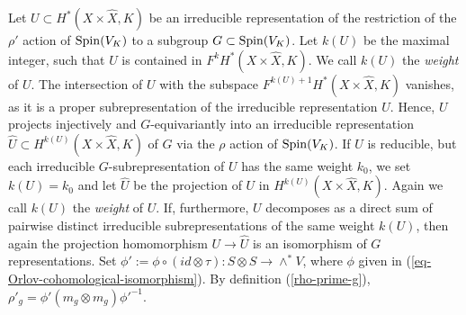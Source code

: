 \documentclass[12pt]{amsart}
\newcommand{\hide}[1]{}
\numberwithin{equation}{subsection}
\theoremstyle{plain}
\theoremstyle{definition}
\newcommand{\ZZ}{{\mathbb Z}}
\newcommand{\Spin}{{\rm Spin}}
\begin{document}
\hide{
Let $\tilde{\gamma}:DMon(X)\rightarrow GL(H^*(X\times\hat{X},\ZZ))$ be the action of the derived monodromy group of $X$ as in the proof of Lemma \ref{ch-3-alpha-is-second-partial-of-J}. Given $g\in DMon(X),$ the automorphism $\tilde{\gamma}(g)$ preserves the decreasing filtration $F^kH^*(X\times\hat{X},\ZZ):=\oplus_{i\geq k} H^i(X\times\hat{X},\ZZ)$, $0\leq k\leq 4n$.
We get an associated graded automorphism $\gamma(g)\in GL(H^*(X\times\hat{X},\ZZ))$ and the representation
\[
\gamma:DMon(X)\rightarrow GL(H^*(X\times\hat{X},\ZZ)).
\]
Denote by $\gamma_i:DMon(X)\rightarrow GL(H^i(X\times\hat{X},\ZZ))$ the restriction of the representation $\gamma$ to the $i$-th graded summand. Then $\gamma_1$ maps $DMon(X)/\{\pm 1\}$ isomorphically onto the image $SO^+(V)$ of $\Spin(V)$ in the orthogonal group of $V$ and $\gamma_i$ is $\wedge^i\gamma_1$. We denote by 
\[
\rho:\Spin(V)\rightarrow GL(\wedge^* V)\cong GL(H^*(X\times\hat{X},\ZZ))
\]
the graded extension of the natural homomorphism $\rho:\Spin(V)\rightarrow SO^+(V)$. Then $\gamma$ conjugates to $\rho$ via the isomorphism $DMon(X)\cong \Spin(V)$. The latter isomorphism is due to the fact that each is isomorphic to its image in $GL(S)$, $S=H^*(X,\ZZ)$, and the two images coincide.
Let
\[
\rho':\Spin(V)\rightarrow  GL(H^*(X\times\hat{X},\ZZ))
\]
be the conjugate of $\tilde{\gamma}$ via the above mentioned isomorphism $DMon(X)\cong \Spin(V)$.
The isomorphism $\phi:S\otimes S\rightarrow \wedge^*V,$ given in (\ref{eq-Orlov-cohomological-isomorphism}),  conjugates the $\Spin(V)$ action on $H^*(X\times X,\ZZ)$ to the $\rho'$ action. 
}

Let $U\subset H^*(X\times \hat{X},K)$ be an irreducible representation of the restriction of the $\rho'$ action of $\Spin(V_K)$ to a subgroup $G\subset \Spin(V_K)$.
Let $k(U)$ be the maximal integer, such that $U$ is contained in $F^kH^*(X\times \hat{X},K)$. We call $k(U)$ the {\em weight} of $U$. The intersection  of $U$ with the subspace $F^{k(U)+1}H^*(X\times \hat{X},K)$ vanishes, as it  is a proper subrepresentation of the irreducible representation $U$. Hence, $U$ projects injectively 
and $G$-equivariantly into an irreducible representation $\hat{U}\subset H^{k(U)}(X\times \hat{X},K)$ of $G$ via the $\rho$ action of $\Spin(V_K)$. If $U$ is reducible, but each irreducible $G$-subrepresentation of $U$ has the same weight $k_0$, we set $k(U)=k_0$ and let $\hat{U}$ be the projection of $U$ in $H^{k(U)}(X\times \hat{X},K)$. Again we call $k(U)$ the {\em weight} of $U$. If, furthermore, $U$ decomposes as a direct sum of pairwise distinct irreducible subrepresentations of the same weight $k(U)$,  then again the projection homomorphism $U\rightarrow \hat{U}$ is an isomorphism of $G$ representations.
Set $\phi':=\phi\circ(id\otimes\tau):S\otimes S\rightarrow \wedge^*V$, where $\phi$ given in (\ref{eq-Orlov-cohomological-isomorphism}). By definition (\ref{rho-prime-g}),
$\rho'_g=\phi'(m_g\otimes m_g)\phi'^{-1}$.
\end{document}
